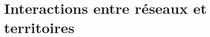 





\chapter{Interactions entre réseaux et territoires}


\label{ch:thematic} %








\bigskip


